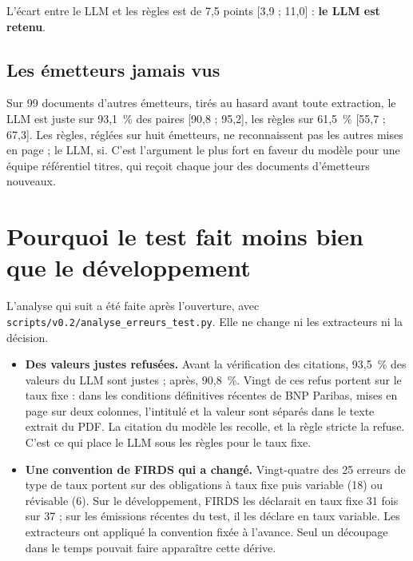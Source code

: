 \documentclass[11pt,a4paper]{article}
\begin{document}
L'écart entre le LLM et les règles est de 7,5 points [3,9 ; 11,0] : \textbf{le LLM est retenu}.

\subsection{Les émetteurs jamais vus}

Sur 99 documents d'autres émetteurs, tirés au hasard avant toute extraction, le LLM est juste sur 93,1~\% des paires [90,8 ; 95,2], les règles sur 61,5~\% [55,7 ; 67,3]. Les règles, réglées sur huit émetteurs, ne reconnaissent pas les autres mises en page ; le LLM, si. C'est l'argument le plus fort en faveur du modèle pour une équipe référentiel titres, qui reçoit chaque jour des documents d'émetteurs nouveaux.

\section{Pourquoi le test fait moins bien que le développement}

L'analyse qui suit a été faite après l'ouverture, avec \texttt{scripts/v0.2/analyse\_erreurs\_test.py}. Elle ne change ni les extracteurs ni la décision.

\begin{itemize}
  \item \textbf{Des valeurs justes refusées.} Avant la vérification des citations, 93,5~\% des valeurs du LLM sont justes ; après, 90,8~\%. Vingt de ces refus portent sur le taux fixe : dans les conditions définitives récentes de BNP Paribas, mises en page sur deux colonnes, l'intitulé et la valeur sont séparés dans le texte extrait du PDF. La citation du modèle les recolle, et la règle stricte la refuse. C'est ce qui place le LLM sous les règles pour le taux fixe.
  \item \textbf{Une convention de FIRDS qui a changé.} Vingt-quatre des 25 erreurs de type de taux portent sur des obligations à taux fixe puis variable (18) ou révisable (6). Sur le développement, FIRDS les déclarait en taux fixe 31 fois sur 37 ; sur les émissions récentes du test, il les déclare en taux variable. Les extracteurs ont appliqué la convention fixée à l'avance. Seul un découpage dans le temps pouvait faire apparaître cette dérive.
\end{itemize}

\end{document}

